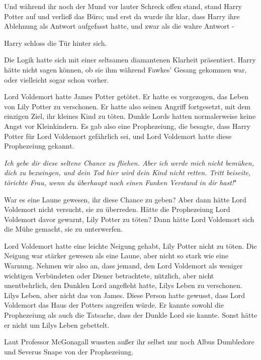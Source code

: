 Und während ihr noch der Mund vor lauter Schreck offen stand, stand Harry Potter
auf und verließ das Büro; und erst da wurde ihr klar, dass Harry ihre Ablehnung
als Antwort aufgefasst hatte, und zwar als die wahre Antwort -

Harry schloss die Tür hinter sich.

Die Logik hatte sich mit einer seltsamen diamantenen Klarheit präsentiert. Harry
hätte nicht sagen können, ob sie ihm während Fawkes' Gesang gekommen war, oder
vielleicht sogar schon vorher.

Lord Voldemort hatte James Potter getötet. Er hatte es vorgezogen, das Leben von
Lily Potter zu verschonen. Er hatte also seinen Angriff fortgesetzt, mit dem
einzigen Ziel, ihr kleines Kind zu töten. Dunkle Lords hatten normalerweise
keine Angst vor Kleinkindern. Es gab also eine Prophezeiung, die besagte, dass
Harry Potter für Lord Voldemort gefährlich sei, und Lord Voldemort hatte diese
Prophezeiung gekannt.

\glqq{}\emph{Ich gebe dir diese seltene Chance zu fliehen. Aber ich werde mich
nicht bemühen, dich zu bezwingen, und dein Tod hier wird dein Kind nicht retten.
Tritt beiseite, törichte Frau, wenn du überhaupt noch einen Funken Verstand in
dir hast!}"

War es eine Laune gewesen, ihr diese Chance zu geben? Aber dann hätte Lord
Voldemort nicht versucht, sie zu überreden. Hätte die Prophezeiung Lord
Voldemort davor gewarnt, Lily Potter zu töten? Dann hätte Lord Voldemort sich
die Mühe gemacht, sie zu unterwerfen.

Lord Voldemort hatte eine leichte Neigung gehabt, Lily Potter nicht zu töten.
Die Neigung war stärker gewesen als eine Laune, aber nicht so stark wie eine
Warnung. Nehmen wir also an, dass jemand, den Lord Voldemort als weniger
wichtigen Verbündeten oder Diener betrachtete, nützlich, aber nicht
unentbehrlich, den Dunklen Lord angefleht hatte, Lilys Leben zu verschonen.
Lilys Leben, aber nicht das von James. Diese Person hatte gewusst, dass Lord
Voldemort das Haus der Potters angreifen würde. Er kannte sowohl die
Prophezeiung als auch die Tatsache, dass der Dunkle Lord sie kannte. Sonst hätte
er nicht um Lilys Leben gebettelt.

Laut Professor McGonagall wussten außer ihr selbst nur noch Albus Dumbledore und
Severus Snape von der Prophezeiung.

